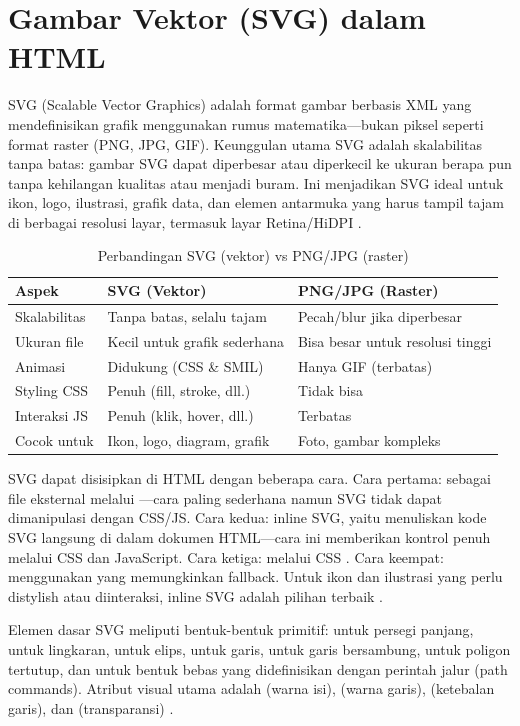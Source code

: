 ﻿\section{Gambar Vektor (SVG) dalam HTML}

SVG (Scalable Vector Graphics) adalah format gambar berbasis XML yang mendefinisikan grafik menggunakan rumus matematika---bukan piksel seperti format raster (PNG, JPG, GIF). Keunggulan utama SVG adalah skalabilitas tanpa batas: gambar SVG dapat diperbesar atau diperkecil ke ukuran berapa pun tanpa kehilangan kualitas atau menjadi buram. Ini menjadikan SVG ideal untuk ikon, logo, ilustrasi, grafik data, dan elemen antarmuka yang harus tampil tajam di berbagai resolusi layar, termasuk layar Retina/HiDPI \cite{mdnHtmlIntro}.

\begin{table}[H]
\centering
\begin{tabular}{|P{3cm}|P{4.5cm}|P{4.5cm}|}
\hline
\textbf{Aspek} & \textbf{SVG (Vektor)} & \textbf{PNG/JPG (Raster)} \\
\hline
Skalabilitas & Tanpa batas, selalu tajam & Pecah/blur jika diperbesar \\
\hline
Ukuran file & Kecil untuk grafik sederhana & Bisa besar untuk resolusi tinggi \\
\hline
Animasi & Didukung (CSS \& SMIL) & Hanya GIF (terbatas) \\
\hline
Styling CSS & Penuh (fill, stroke, dll.) & Tidak bisa \\
\hline
Interaksi JS & Penuh (klik, hover, dll.) & Terbatas \\
\hline
Cocok untuk & Ikon, logo, diagram, grafik & Foto, gambar kompleks \\
\hline
\end{tabular}
\caption{Perbandingan SVG (vektor) vs PNG/JPG (raster)}
\end{table}

SVG dapat disisipkan di HTML dengan beberapa cara. Cara pertama: sebagai file eksternal melalui ---cara paling sederhana namun SVG tidak dapat dimanipulasi dengan CSS/JS. Cara kedua: inline SVG, yaitu menuliskan kode SVG langsung di dalam dokumen HTML---cara ini memberikan kontrol penuh melalui CSS dan JavaScript. Cara ketiga: melalui CSS . Cara keempat: menggunakan  yang memungkinkan fallback. Untuk ikon dan ilustrasi yang perlu distylish atau diinteraksi, inline SVG adalah pilihan terbaik \cite{webdevHtml}.

Elemen dasar SVG meliputi bentuk-bentuk primitif:  untuk persegi panjang,  untuk lingkaran,  untuk elips,  untuk garis,  untuk garis bersambung,  untuk poligon tertutup, dan  untuk bentuk bebas yang didefinisikan dengan perintah jalur (path commands). Atribut visual utama adalah  (warna isi),  (warna garis),  (ketebalan garis), dan  (transparansi) \cite{mdnHtmlIntro}.

